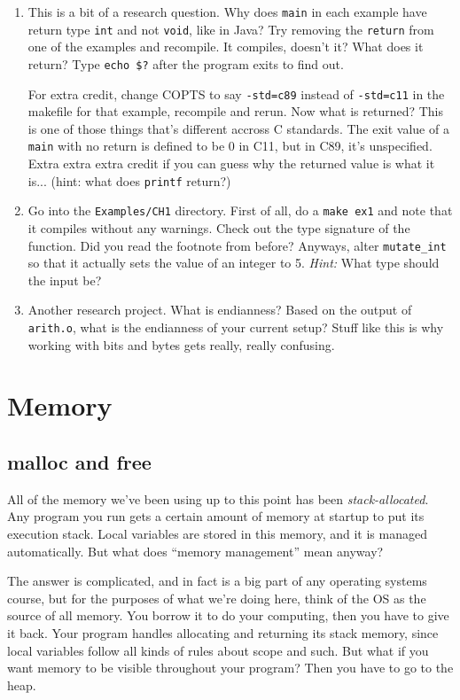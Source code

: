 \documentclass[ebook,11pt,oneside,openany]{memoir}
\newcommand{\cf}[1]{\texttt{#1}}
\begin{document}
\begin{enumerate}
\item This is a bit of a research question. Why does \texttt{main} in each example have return type \texttt{int} and not \texttt{void}, like in Java? Try removing the \texttt{return} from one of the examples and recompile.  It compiles, doesn't it? What does it return? Type \texttt{echo \$?} after the program exits to find out.

For extra credit, change COPTS to say \texttt{-std=c89} instead of \cf{-std=c11} in the makefile for that example, recompile and rerun. Now what is returned? This is one of those things that's different accross C standards. The exit value of a \texttt{main} with no return is defined to be 0 in C11, but in C89, it's unspecified. Extra extra extra credit if you can guess why the returned value is what it is... (hint: what does \cf{printf} return?)

\item Go into the \cf{Examples/CH1} directory. First of all, do a \texttt{make ex1} and note that it compiles without any warnings. Check out the type signature of the function. Did you read the footnote from before? Anyways, alter \texttt{mutate\_int} so that it actually sets the value of an integer to 5. \textit{Hint:} What type should the input be?

\item Another research project. What is endianness? Based on the output of \texttt{arith.o}, what is the endianness of your current setup? Stuff like this is why working with bits and bytes gets really, really confusing.
\end{enumerate}


\chapter{Memory}
\section{malloc and free}
All of the memory we've been using up to this point has been \textit{stack-allocated}. Any program you run gets a certain amount of memory at startup to put its execution stack. Local variables are stored in this memory, and it is managed automatically. But what does ``memory management'' mean anyway? 

The answer is complicated, and in fact is a big part of any operating systems course, but for the purposes of what we're doing here, think of the OS as the source of all memory. You borrow it to do your computing, then you have to give it back. Your program handles allocating and returning its stack memory, since local variables follow all kinds of rules about scope and such. But what if you want memory to be visible throughout your program? Then you have to go to the heap.
\end{document}
